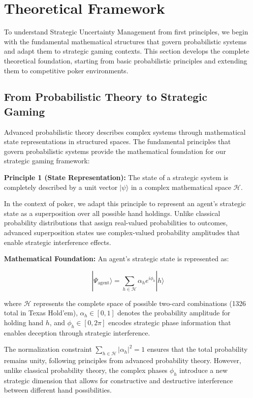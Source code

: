\documentclass[11pt,a4paper]{article}
\begin{document}
\section{Theoretical Framework}

To understand Strategic Uncertainty Management from first principles, we begin with the fundamental mathematical structures that govern probabilistic systems and adapt them to strategic gaming contexts. This section develops the complete theoretical foundation, starting from basic probabilistic principles and extending them to competitive poker environments.

\subsection{From Probabilistic Theory to Strategic Gaming}

Advanced probabilistic theory describes complex systems through mathematical state representations in structured spaces. The fundamental principles that govern probabilistic systems provide the mathematical foundation for our strategic gaming framework:

\textbf{Principle 1 (State Representation):} The state of a strategic system is completely described by a unit vector $|\psi\rangle$ in a complex mathematical space $\mathcal{H}$.

In the context of poker, we adapt this principle to represent an agent's strategic state as a superposition over all possible hand holdings. Unlike classical probability distributions that assign real-valued probabilities to outcomes, advanced superposition states use complex-valued probability amplitudes that enable strategic interference effects.

\textbf{Mathematical Foundation:} An agent's strategic state is represented as:

\begin{equation}
|\Psi_{\text{agent}}\rangle = \sum_{h \in \mathcal{H}} \alpha_h e^{i\phi_h} |h\rangle
\end{equation}

where $\mathcal{H}$ represents the complete space of possible two-card combinations (1326 total in Texas Hold'em), $\alpha_h \in [0,1]$ denotes the probability amplitude for holding hand $h$, and $\phi_h \in [0, 2\pi]$ encodes strategic phase information that enables deception through strategic interference.

The normalization constraint $\sum_{h \in \mathcal{H}} |\alpha_h|^2 = 1$ ensures that the total probability remains unity, following principles from advanced probability theory. However, unlike classical probability theory, the complex phases $\phi_h$ introduce a new strategic dimension that allows for constructive and destructive interference between different hand possibilities.
\end{document}
